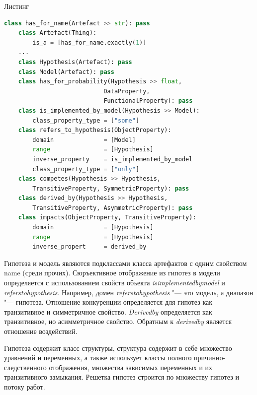 \begin{ListingEnv}[!h]%
    \captiondelim{ } %
    \caption{Листинг}\label{lst:hwbeauty}
    \begin{lstlisting}[language={Python}]
    class has_for_name(Artefact >> str): pass
    class Artefact(Thing):
        is_a = [has_for_name.exactly(1)]
    ...
    class Hypothesis(Artefact): pass
    class Model(Artefact): pass
    class has_for_probability(Hypothesis >> float,
                            DataProperty,
                            FunctionalProperty): pass
    class is_implemented_by_model(Hypothesis >> Model): 
        class_property_type = ["some"]
    class refers_to_hypothesis(ObjectProperty):
        domain              = [Model]
        range               = [Hypothesis]
        inverse_property    = is_implemented_by_model
        class_property_type = ["only"]
    class competes(Hypothesis >> Hypothesis, 
        TransitiveProperty, SymmetricProperty): pass
    class derived_by(Hypothesis >> Hypothesis, 
        TransitiveProperty, AsymmetricProperty): pass
    class impacts(ObjectProperty, TransitiveProperty):
        domain              = [Hypothesis]
        range               = [Hypothesis]
        inverse_propert     = derived_by
    \end{lstlisting}
\end{ListingEnv}%

Гипотеза и модель являются подклассами класса артефактов с одним свойством name (среди прочих). Сюръективное 
отображение из гипотез в модели определяется с использованием свойств объекта 
\textit{is\textunderscore implemented\textunderscore by\textunderscore model} и 
\textit{refers\textunderscore to\textunderscore hypothesis}. Например, домен 
\textit{refers\textunderscore to\textunderscore hypothesis} "--- это модель, а диапазон "--- гипотеза. Отношение 
конкуренции определяется для гипотез как транзитивное и симметричное свойство. \textit{Derived\textunderscore by} 
определяется как транзитивное, но асимметричное свойство. Обратным к \textit{derived\textunderscore by} 
является отношение воздействий.

Гипотеза содержит класс структуры, структура содержит в себе множество уравнений и переменных, а также использует 
классы полного причинно-следственного отображения, множества зависимых переменных и их транзитивного замыкания. 
Решетка гипотез строится по множеству гипотез и потоку работ.

